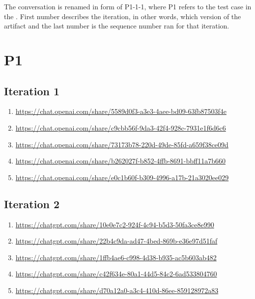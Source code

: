 
The conversation is renamed in form of P1-1-1, where P1 refers to the test case in the \textcite{act_rule_g88}. First number describes the iteration, in other words, which version of the artifact and the last number is the sequence number ran for that iteration.


\section{P1\label{P1-1}}

\subsection{Iteration 1}

\begin{enumerate}
    \item \href{https://chat.openai.com/share/5589d0f3-a3e3-4aee-bd09-63fb87503f4e}{https://chat.openai.com/share/5589d0f3-a3e3-4aee-bd09-63fb87503f4e}
    \item \href{https://chat.openai.com/share/c9cbb56f-9da3-42f4-928c-7931e1f6d6c6}{https://chat.openai.com/share/c9cbb56f-9da3-42f4-928c-7931e1f6d6c6}
    \item \href{https://chat.openai.com/share/73173b78-220d-49de-85fd-a659f38ce09d}{https://chat.openai.com/share/73173b78-220d-49de-85fd-a659f38ce09d}
    \item \href{https://chat.openai.com/share/b262027f-b852-4ffb-8691-bbff11a7b660}{https://chat.openai.com/share/b262027f-b852-4ffb-8691-bbff11a7b660}
    \item \href{https://chat.openai.com/share/e0c1b60f-b309-4996-a17b-21a3020ee029}{https://chat.openai.com/share/e0c1b60f-b309-4996-a17b-21a3020ee029}
\end{enumerate}

\subsection{Iteration 2}

\begin{enumerate}
    \item \href{https://chatgpt.com/share/10e0e7c2-924f-4c94-b5d3-50fa3ce8e990}{https://chatgpt.com/share/10e0e7c2-924f-4c94-b5d3-50fa3ce8e990}
    \item \href{https://chatgpt.com/share/22b4c9da-ad47-4bed-869b-e36e97d51faf}{https://chatgpt.com/share/22b4c9da-ad47-4bed-869b-e36e97d51faf}
    \item \href{https://chatgpt.com/share/1ffb4ae6-c998-4d38-b935-ac5b603ab482}{https://chatgpt.com/share/1ffb4ae6-c998-4d38-b935-ac5b603ab482}
    \item \href{https://chatgpt.com/share/c42f634e-80a1-44d5-84c2-6ad533804760}{https://chatgpt.com/share/c42f634e-80a1-44d5-84c2-6ad533804760}
    \item \href{https://chatgpt.com/share/d70a12a0-a3c4-410d-86ee-859128972a83}{https://chatgpt.com/share/d70a12a0-a3c4-410d-86ee-859128972a83}
\end{enumerate}


